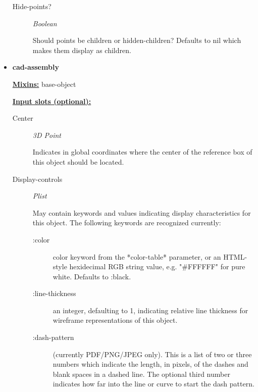 \documentclass [11pt]{book}
\begin{document}
\begin{itemize}
\begin{description}
\item [Hide-points?]
\emph{Boolean}

 Should points be children or hidden-children?
Defaults to nil which makes them display as children.




\end{description}







\item {}
\label{prim:cad-assembly}
\textbf{cad-assembly}


\textbf{
\underline{Mixins:}} base-object









\textbf{
\underline{Input slots (optional):}}

\begin{description}

\item [Center]
\emph{3D Point}

 Indicates in global coordinates where the center of the reference
box of this object should be located.




\item [Display-controls]
\emph{Plist}

 May contain keywords and values indicating display characteristics for
this object. The following keywords are recognized currently:



\begin{description}


\item[:color]
 color keyword from the *color-table* parameter, or an HTML-style hexidecimal
RGB string value, e.g. "\#FFFFFF" for pure white. Defaults to :black.


\item[:line-thickness]
 an integer, defaulting to 1, indicating relative line thickness for wireframe
representations of this object.


\item[:dash-pattern]
(currently PDF/PNG/JPEG only). This is a list of two or three numbers which indicate the length,
in pixels, of the dashes and blank spaces in a dashed line. The optional third number
indicates how far into the line or curve to start the dash pattern.


\end{description}
\end{description}
\end{itemize}
\end{document}
